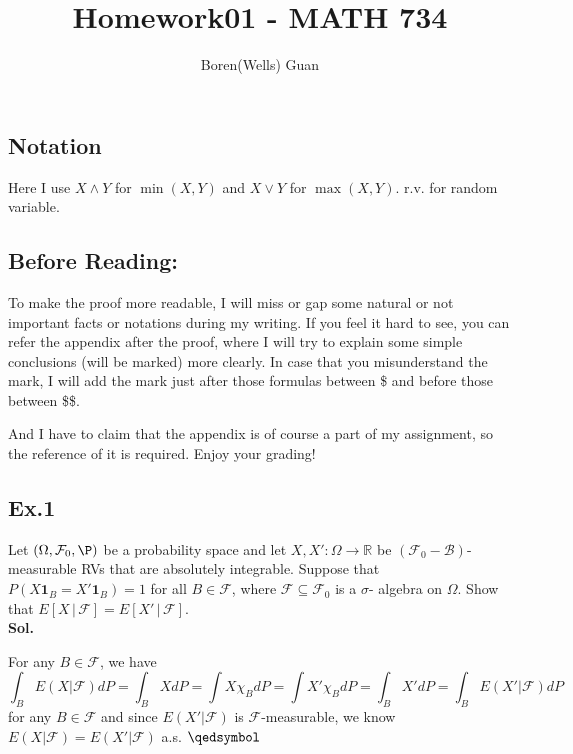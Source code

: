 \documentclass[lang=en,11pt,a4paper,citestyle =authoryear]{elegantpaper}
\title{Homework01 - MATH 734}
\author{Boren(Wells) Guan}
\newcommand{\prvd}{$\hfill \qedsymbol$}
\newcommand{\R}{\mathbb{R}}
\newcommand{\F}{\mathcal{F}}
\begin{document}
\maketitle

\subsection*{Notation}
Here I use $X \wedge Y$ for $\min(X,Y)$ and $X\vee Y$ for $\max(X,Y)$. r.v. for random variable.

\subsection*{Before Reading:}\par
To make the proof more readable, I will miss or gap some natural or not important facts or notations during my writing. If you feel it hard to see, you can refer the appendix after the proof, where I will try to explain some simple conclusions (will be marked) more clearly. In case that you misunderstand the mark, I will add the mark just after those formulas between \$ and before those between \$\$.\par
And I have to claim that the appendix is of course a part of my assignment, so the reference of it is required. Enjoy your grading!

\subsection*{Ex.1} 
Let $(\Omega, \mathcal{F}_{0},\P)$ be a probability space and let $X,X':\Omega \rightarrow \R$ be $(\mathcal{F}_{0}-\mathcal{B})$-measurable RVs that are
absolutely integrable. Suppose that $P(X\mathbf{1}_{B}=X'\mathbf{1}_{B})=1$ for
all $B\in \mathcal{F}$, where $\mathcal{F}\subseteq \mathcal{F}_{0}$ is a $\sigma$-
algebra on $\Omega$. Show that $E[X\,|\, \mathcal{F}]=E[X'\,|\, \mathcal{F}]$.
\vspace{0.5em}\\
\textbf{Sol.} \par
For any $B\in \F$, we have
\[
\int_B E(X|\F)dP = \int_B X dP = \int X\chi_B dP = \int X'\chi_B dP = \int_B X' dP = \int_B E(X'|\F) dP
\]
for any $B\in \F$ and since $E(X'|\F)$ is $\F$-measurable, we know $E(X|\F) = E(X'|\F)$ a.s.
\prvd
\vspace{0.5em}
\end{document}
